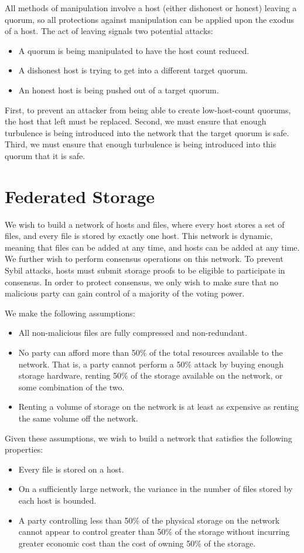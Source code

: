 \documentclass[twocolumn]{article}
\begin{document}
All methods of manipulation involve a host (either dishonest or honest) leaving a quorum, so all protections against manipulation can be applied upon the exodus of a host.
The act of leaving signals two potential attacks:
\begin{itemize}
	\item A quorum is being manipulated to have the host count reduced.
	\item A dishonest host is trying to get into a different target quorum.
	\item An honest host is being pushed out of a target quorum.
\end{itemize}

First, to prevent an attacker from being able to create low-host-count quorums, the host that left must be replaced.
Second, we must ensure that enough turbulence is being introduced into the network that the target quorum is safe.
Third, we must ensure that enough turbulence is being introduced into this quorum that it is safe.

\section{Federated Storage}
We wish to build a network of hosts and files, where every host stores a set of files, and every file is stored by exactly one host.
This network is dynamic, meaning that files can be added at any time, and hosts can be added at any time.
We further wish to perform consensus operations on this network.
To prevent Sybil attacks, hosts must submit storage proofs to be eligible to participate in consensus.
In order to protect consensus, we only wish to make sure that no malicious party can gain control of a majority of the voting power.

We make the following assumptions:
\begin{itemize}
	\item All non-malicious files are fully compressed and non-redundant.
	\item No party can afford more than 50\% of the total resources available to the network. That is, a party cannot perform a 50\% attack by buying enough storage hardware, renting 50\% of the storage available on the network, or some combination of the two.
	\item Renting a volume of storage on the network is at least as expensive as renting the same volume off the network.
\end{itemize}

Given these assumptions, we wish to build a network that satisfies the following properties:
\begin{itemize}
	\item Every file is stored on a host.
	\item On a sufficiently large network, the variance in the number of files stored by each host is bounded.
	\item A party controlling less than 50\% of the physical storage on the network cannot appear to control greater than 50\% of the storage without incurring greater economic cost than the cost of owning 50\% of the storage.
\end{itemize}
\end{document}
